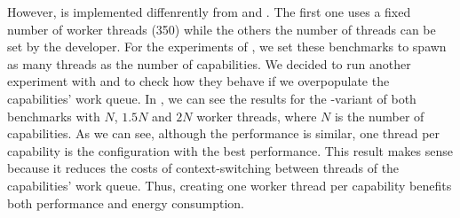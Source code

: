 However, \regex is implemented diffenrently from \mandelbrot and \spectral. The first one uses a fixed number of worker threads (350) while the others the number of threads can be set by the developer. For the experiments of , we set these benchmarks to spawn as many threads as the number of capabilities. We decided to run another experiment with \mandelbrot and \spectral to check how they behave if we overpopulate the capabilities' work queue. In , we can see the results for the \forkOn-\MVar variant of both benchmarks with $N$, $1.5N$ and $2N$ worker threads, where $N$ is the number of capabilities. As we can see, although the performance is similar, one thread per capability is the configuration with the best performance. This result makes sense because it reduces the costs of context-switching between threads of the capabilities' work queue. Thus, creating one worker thread per capability benefits both performance and energy consumption.

